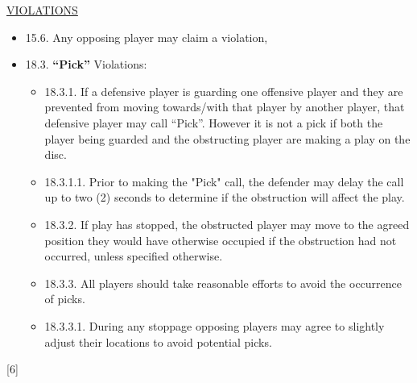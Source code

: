 \begin{center}\underline{\uppercase{violations}}\end{center}
\begin{itemize}[noitemsep]
    \tiny
    \item 15.6. Any opposing player may claim a violation,
    \item 18.3. \textbf{“Pick”} Violations:
        \begin{itemize}
            \item 18.3.1. If a defensive player is guarding one offensive player and they are prevented from moving towards/with that player by another player, that defensive player may call “Pick”. However it is not a pick if both the player being guarded and the obstructing player are making a play on the disc.
            \item 18.3.1.1. Prior to making the "Pick" call, the defender may delay the call up to two (2) seconds to determine if the obstruction will affect the play.
            \item 18.3.2. If play has stopped, the obstructed player may move to the agreed position they would have otherwise occupied if the obstruction had not occurred, unless specified otherwise.
            \item 18.3.3. All players should take reasonable efforts to avoid the occurrence of picks.
            \item 18.3.3.1. During any stoppage opposing players may agree to slightly adjust their locations to avoid potential picks.
        \end{itemize}
\end{itemize}
\begin{center}[6]\end{center}
